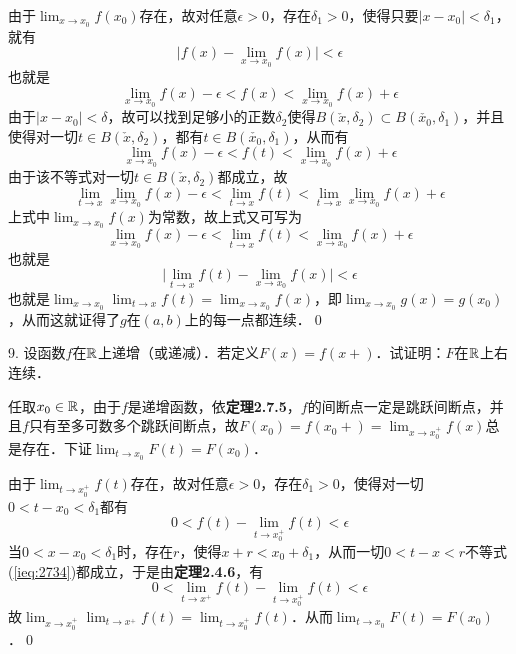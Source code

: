 由于$\displaystyle\lim_{x \to x_0} f(x_0)$存在，故对任意$\epsilon > 0$，存在$\delta_1 > 0$，使得只要$\lvert x - x_0 \rvert < \delta_1$，就有
\begin{equation}
    \lvert f(x) - \lim_{x \to x_0} f(x) \rvert < \epsilon
\end{equation}
也就是
\begin{equation}
    \lim_{x \to x_0} f(x) - \epsilon < f(x) < \lim_{x \to x_0} f(x) + \epsilon
\end{equation}
由于$\lvert x - x_0 \rvert < \delta$，故可以找到足够小的正数$\delta_2$使得$B(\check{x}, \delta_2) \subset B(\check{x_0}, \delta_1)$，并且使得对一切$t \in B(\check{x},\delta_2)$，都有$t \in B(\check{x_0},\delta_1)$，从而有
\begin{equation}
    \lim_{x \to x_0} f(x) - \epsilon < f(t) < \lim_{x \to x_0} f(x) + \epsilon
\end{equation}
由于该不等式对一切$t \in B(\check{x}, \delta_2)$都成立，故
\begin{equation}
    \lim_{t \to x}\lim_{x \to x_0} f(x) - \epsilon < \lim_{t \to x} f(t) < \lim_{t \to x}\lim_{x \to x_0} f(x) + \epsilon
\end{equation}
上式中$\displaystyle\lim_{x \to x_0} f(x)$为常数，故上式又可写为
\begin{equation}
    \lim_{x \to x_0} f(x) - \epsilon < \lim_{t \to x} f(t) < \lim_{x \to x_0} f(x) + \epsilon
\end{equation}
也就是
\begin{equation}
    \lvert \lim_{t \to x} f(t) - \lim_{x \to x_0} f(x) \rvert < \epsilon
\end{equation}
也就是$\displaystyle\lim_{x \to x_0} \lim_{t \to x} f(t) = \displaystyle\lim_{x \to x_0} f(x)$，即$\displaystyle\lim_{x \to x_0} g(x) = g(x_0)$，从而这就证得了$g$在$(a,b)$上的每一点都连续．\qed\bigskip

9. 设函数$f$在$\mathbb{R}$上递增（或递减）．若定义$F(x)=f(x+)$．试证明：$F$在$\mathbb{R}$上右连续．\bigskip

\prove 任取$x_0 \in \mathbb{R}$，由于$f$是递增函数，依\textbf{定理2.7.5}，$f$的间断点一定是跳跃间断点，并且$f$只有至多可数多个跳跃间断点，故$F(x_0) = f(x_0 +) = \displaystyle\lim_{x \to x_0^+} f(x)$总是存在．下证$\displaystyle\lim_{t \to x_0} F(t) = F(x_0)$．

由于$\displaystyle\lim_{t \to x_0^+} f(t)$存在，故对任意$\epsilon > 0$，存在$\delta_1 > 0$，使得对一切$0 < t - x_0 < \delta_1$都有
\begin{equation}
    0 < f(t) - \lim_{t \to x_0^+} f(t) < \epsilon
    \label{ieq:2734}
\end{equation}
当$0 < x - x_0 < \delta_1$时，存在$r$，使得$x+r < x_0+\delta_1$，从而一切$0< t-x  < r$不等式(\ref{ieq:2734})都成立，于是由\textbf{定理2.4.6}，有
\begin{equation}
    0 < \lim_{t \to x^+} f(t) - \lim_{t \to x_0^+} f(t) < \epsilon
\end{equation}
故$\displaystyle\lim_{x \to x_0^+} \displaystyle\lim_{t \to x^+} f(t) = \lim_{t \to x_0^+} f(t)$．从而$\displaystyle\lim_{t \to x_0} F(t) = F(x_0)$．\qed\bigskip